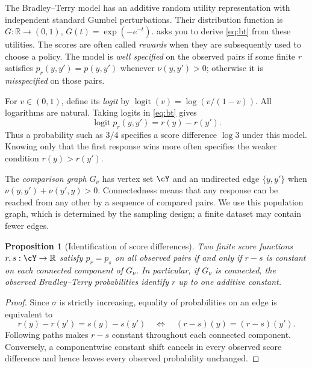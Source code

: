 \documentclass[11pt,twoside]{article}
\newcommand{\R}{\mathbb R}
\newtheorem{proposition}[theorem]{Proposition}
\theoremstyle{definition}
\theoremstyle{remark}
\begin{document}
The Bradley--Terry model has an additive random utility representation with
independent standard Gumbel perturbations. Their distribution function is
$G:\R\to(0,1)$, $G(t)=\exp(-e^{-t})$.
 asks you to derive \cref{eq:bt} from
these utilities.\label{en:preference-models}
The scores are often called \emph{rewards} when they are subsequently used
to choose a policy. The model is \emph{well specified} on the observed
pairs if some finite $r$ satisfies $p_r(y,y')=p(y,y')$ whenever
$\nu(y,y')>0$; otherwise it is \emph{misspecified} on those pairs.

For $v\in(0,1)$, define its \emph{logit} by
$\operatorname{logit}(v)=\log(v/(1-v))$. All logarithms are natural.
Taking logits in \cref{eq:bt} gives
\begin{equation}
 \operatorname{logit}p_r(y,y')=r(y)-r(y').
 \label{eq:logit-difference}
\end{equation}
Thus a probability such as $3/4$ specifies a score difference $\log3$
under this model. Knowing only that the first response wins more often
specifies the weaker condition $r(y)>r(y')$.

The \emph{comparison graph} $G_\nu$ has vertex set $\cY$ and an undirected
edge $\{y,y'\}$ when $\nu(y,y')+\nu(y',y)>0$. Connectedness means that
any response can be reached from any other by a sequence of compared pairs.
We use this population graph, which is determined by the sampling design;
a finite dataset may contain fewer edges.

\begin{proposition}[Identification of score differences]
\label{prop:identification}
Two finite score functions $r,s:\cY\to\R$ satisfy $p_r=p_s$ on all
observed pairs if and only if $r-s$ is constant on each connected component
of $G_\nu$. In particular, if $G_\nu$ is connected, the observed
Bradley--Terry probabilities identify $r$ up to one additive constant.
\end{proposition}

\begin{proof}
Since $\sigma$ is strictly increasing, equality of probabilities on an
edge is equivalent to
\[
 r(y)-r(y')=s(y)-s(y')
 \quad\Longleftrightarrow\quad
 (r-s)(y)=(r-s)(y').
\]
Following paths makes $r-s$ constant throughout each connected component.
Conversely, a componentwise constant shift cancels in every observed score
difference and hence leaves every observed probability unchanged.
\end{proof}
\end{document}
